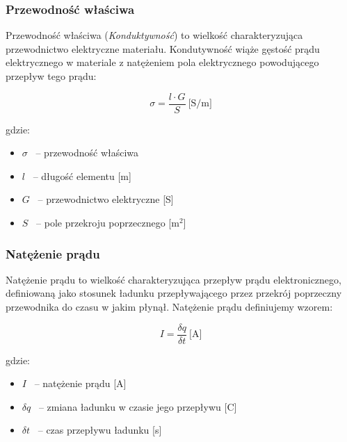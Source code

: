 \documentclass[a4paper,12pts]{article}
\begin{document}

	\subsubsection{Przewodność właściwa}
	
	Przewodność właściwa (\textit{Konduktywność}) to wielkość charakteryzująca przewodnictwo elektryczne materiału. Kondutywność wiąże gęstość prądu elektrycznego w materiale z natężeniem pola elektrycznego powodującego przepływ tego prądu: 
	
	\begin{equation}
		\sigma = \frac{l \cdot G}{S} ~\textrm{[S/m]}
	\end{equation}
	
	\newpage
	gdzie:
	\begin{itemize}
		\item $\sigma$ ~-- przewodność właściwa 
		\item $l$ ~-- długość elementu [m]
		\item $G$ ~-- przewodnictwo elektryczne [S]
		\item $S$ ~-- pole przekroju poprzecznego [m$^{2}$]
	\end{itemize}


	\subsubsection{Natężenie prądu}
	
	Natężenie prądu to wielkość charakteryzująca przepływ prądu elektronicznego, definiowaną jako stosunek ładunku przepływającego przez przekrój poprzeczny przewodnika do czasu w jakim płynął. Natężenie prądu definiujemy wzorem:
	
	\begin{equation}
		I = \frac{\delta q}{\delta t} ~\textrm{[A]}
	\end{equation}
	
	gdzie:
	\begin{itemize}
		\item $I$ ~-- natężenie prądu [A]
		\item $\delta q$ ~-- zmiana ładunku w czasie jego przepływu [C]
		\item $\delta t$ ~-- czas przepływu ładunku [s]
	\end{itemize}
\end{document}
